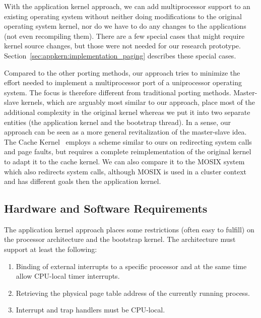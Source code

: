 With the application kernel approach, we can add multiprocessor support to an
existing operating system without neither doing modifications to the original
operating system kernel, nor do we have to do any changes to the applications
(not even recompiling them). There are a few special cases that might require
kernel source changes, but those were not needed for our research prototype.
Section~\ref{sec:appkern:implementation_paging} describes these special cases.

Compared to the other porting methods, our approach tries to minimize the
effort needed to implement a multiprocessor port of a uniprocessor operating
system.  The focus is therefore different from traditional porting methods.
Master-slave kernels, which are arguably most similar to our approach, place
most of the additional complexity in the original kernel whereas we put it
into two separate entities (the application kernel and the bootstrap thread).
In a sense, our approach can be seen as a more general revitalization of the
master-slave idea. The Cache Kernel~\cite{greenwald96synergy,
  cheriton94caching} employs a scheme similar to ours on redirecting system
calls and page faults, but requires a complete reimplementation of the
original kernel to adapt it to the cache kernel. We can also compare it to the
MOSIX system~\cite{mosix} which also redirects system calls, although MOSIX is
used in a cluster context and has different goals then the application kernel.

\subsection{Hardware and Software Requirements}
The application kernel approach places some restrictions (often easy to
fulfill) on the processor architecture and the bootstrap kernel. The
architecture must support at least the following:

\begin{enumerate}
\item Binding of external interrupts to a specific processor and at the same
  time allow CPU-local timer interrupts.
\item Retrieving the physical page table address of the currently running
  process.
\item Interrupt and trap handlers must be CPU-local.
\end{enumerate}


